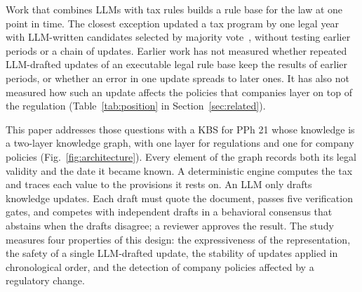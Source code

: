Work that combines LLMs with tax rules builds a rule base for the law at one point in time. The closest exception updated a tax program by one legal year with LLM-written candidates selected by majority vote~\cite{goganikhiabani2025maintaining}, without testing earlier periods or a chain of updates. Earlier work has not measured whether repeated LLM-drafted updates of an executable legal rule base keep the results of earlier periods, or whether an error in one update spreads to later ones. It has also not measured how such an update affects the policies that companies layer on top of the regulation (Table~\ref{tab:position} in Section~\ref{sec:related}).

This paper addresses those questions with a KBS for PPh 21 whose knowledge is a two-layer knowledge graph, with one layer for regulations and one for company policies (Fig.~\ref{fig:architecture}). Every element of the graph records both its legal validity and the date it became known. A deterministic engine computes the tax and traces each value to the provisions it rests on. An LLM only drafts knowledge updates. Each draft must quote the document, passes five verification gates, and competes with independent drafts in a behavioral consensus that abstains when the drafts disagree; a reviewer approves the result. The study measures four properties of this design: the expressiveness of the representation, the safety of a single LLM-drafted update, the stability of updates applied in chronological order, and the detection of company policies affected by a regulatory change.

